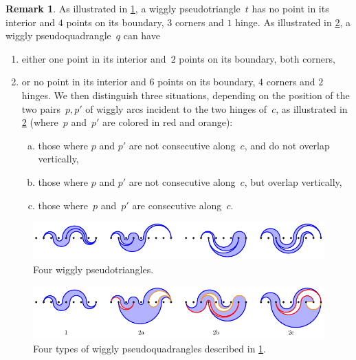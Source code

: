 \documentclass{amsart}
\theoremstyle{definition}
\newtheorem{remark}[theorem]{Remark}
\newcommand{\darkblue}{\color{darkblue}} %
\newcommand{\defn}[1]{\textsl{\darkblue #1}} %
\begin{document}
\begin{remark}
\label{rem:descriptionPseudotrianglesPseudoquadrangles}
As illustrated in \cref{fig:pseudotriangles}, a wiggly pseudotriangle~$t$ has no point in its interior and $4$ points on its boundary, $3$ corners and $1$ hinge.
As illustrated in \cref{fig:pseudoquadrangles}, a wiggly pseudoquadrangle~$q$ can have
\begin{enumerate}
\item either one point in its interior and~$2$ points on its boundary, both corners,
\item or no point in its interior and $6$ points on its boundary, $4$ corners and $2$ hinges. We then distinguish three situations, depending on the position of the two pairs~$p, p'$ of wiggly arcs incident to the two hinges of~$c$, as illustrated in \cref{fig:pseudoquadrangles} (where~$p$ and~$p'$ are colored in red and orange):
\begin{enumerate}[(a)]
\item those where $p$ and $p'$ are not consecutive along~$c$, and do not overlap vertically,
\item those where $p$ and $p'$ are not consecutive along~$c$, but overlap vertically,
\item those where~$p$ and~$p'$ are consecutive along~$c$.
\end{enumerate}
\end{enumerate}
%
\begin{figure}
\centerline{\includegraphics[scale=1.3]{pseudotriangles}}
\caption{Four wiggly pseudotriangles.}
\label{fig:pseudotriangles}
\end{figure}
%
\begin{figure}
\centerline{\includegraphics[scale=1.3]{pseudoquadrangles}}
\vspace{-.3cm}
\caption{Four types of wiggly pseudoquadrangles described in \cref{rem:descriptionPseudotrianglesPseudoquadrangles}.}
\label{fig:pseudoquadrangles}
\end{figure}
\end{remark}
\end{document}
